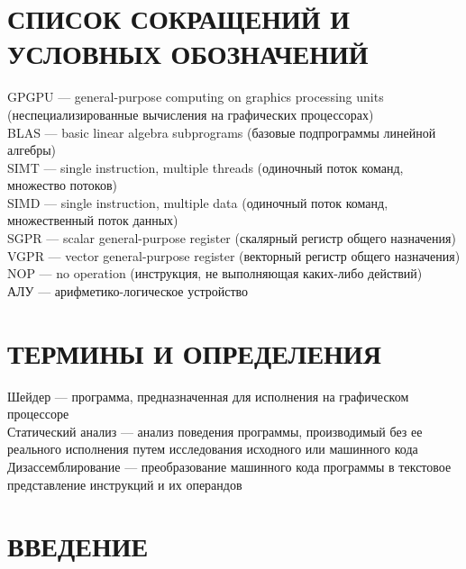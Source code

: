 \documentclass[a4paper,14pt]{extarticle}
\begin{document}
\setcounter{page}{6}
\tableofcontents

\newpage
\section*{СПИСОК СОКРАЩЕНИЙ И УСЛОВНЫХ ОБОЗНАЧЕНИЙ}

GPGPU — general-purpose computing on graphics processing units (неспециализированные вычисления на графических процессорах)\\

BLAS — basic linear algebra subprograms (базовые подпрограммы линейной алгебры)\\

SIMT — single instruction, multiple threads (одиночный поток команд, множество потоков)\\

SIMD — single instruction, multiple data (одиночный поток команд, множественный поток данных)\\

SGPR — scalar general-purpose register (скалярный регистр общего назначения)\\

VGPR — vector general-purpose register (векторный регистр общего назначения)\\

NOP — no operation (инструкция, не выполняющая каких-либо действий)\\

АЛУ — арифметико-логическое устройство

\newpage
\section*{ТЕРМИНЫ И ОПРЕДЕЛЕНИЯ}

Шейдер — программа, предназначенная для исполнения на графическом процессоре\\

Статический анализ — анализ поведения программы, производимый без ее реального исполнения путем исследования исходного или машинного кода\\

Дизассемблирование — преобразование машинного кода программы в текстовое представление инструкций и их операндов\\

\newpage
\section*{ВВЕДЕНИЕ}
\end{document}
